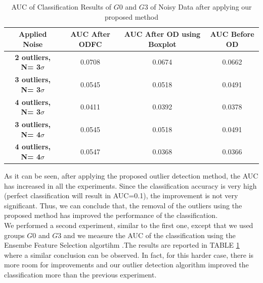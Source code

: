 \begin{table}[h!]
	\centering
	\caption{AUC of Classification Results of $G0$ and $G3$ of Noisy Data after applying our proposed method}
	\begin{tabular}{|c|c|c|c|} 
		\hline
		\textbf{Applied Noise} & \textbf{AUC After ODFC} & \textbf{AUC After OD using Boxplot} &	\textbf{AUC Before OD} \\ [0.5ex] 
		\hline\hline
		\textbf{2 outliers, N= 3$\sigma$
		} & 0.0708  & 0.0674 & 0.0662\\
		\hline
		\textbf{3 outliers, N= 3$\sigma$
		} & 0.0545 & 0.0518 & 0.0491 \\
		\hline
		\textbf{4 outliers, N= 3$\sigma$} & 0.0411  & 0.0392 & 0.0378 \\
		
		\hline
		\textbf{3 outliers, N= 4$\sigma$} & 0.0545  & 0.0518 & 0.0491\\
		\hline
		\textbf{4 outliers, N= 4$\sigma$} & 0.0547 & 0.0368 & 0.0366	 \\ 
		\hline
	\end{tabular}
	\label{fld2}
\end{table}


As it can be seen, after applying the proposed outlier detection method, the AUC has increased in all the experiments. Since the classification accuracy is very high (perfect classification will result in AUC=0.1), the improvement is not very significant. Thus, we can conclude that, the removal of the outliers using the proposed method has improved the performance of the classification.\\
\indent We performed a second experiment, similar to the first one, except that we used groups $G0$ and $G3$ and we measure the AUC of the classification using the Ensembe Feature Selection algortihm \cite{ali}.The results are reported in TABLE \ref{fld2} where a similar conclusion can be observed. In fact, for this harder case, there is more room for improvements and our outlier detection algorithm improved the classification more than the previous experiment.

